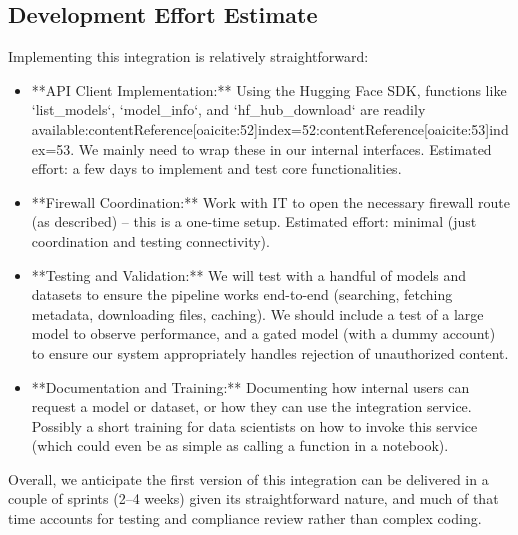 \documentclass{article}
\begin{document}
\subsection*{Development Effort Estimate}
Implementing this integration is relatively straightforward:
\begin{itemize}
    \item **API Client Implementation:** Using the Hugging Face SDK, functions like `list_models`, `model_info`, and `hf_hub_download` are readily available:contentReference[oaicite:52]{index=52}:contentReference[oaicite:53]{index=53}. We mainly need to wrap these in our internal interfaces. Estimated effort: a few days to implement and test core functionalities.
    \item **Firewall Coordination:** Work with IT to open the necessary firewall route (as described) – this is a one-time setup. Estimated effort: minimal (just coordination and testing connectivity).
    \item **Testing and Validation:** We will test with a handful of models and datasets to ensure the pipeline works end-to-end (searching, fetching metadata, downloading files, caching). We should include a test of a large model to observe performance, and a gated model (with a dummy account) to ensure our system appropriately handles rejection of unauthorized content.
    \item **Documentation and Training:** Documenting how internal users can request a model or dataset, or how they can use the integration service. Possibly a short training for data scientists on how to invoke this service (which could even be as simple as calling a function in a notebook).
\end{itemize}
Overall, we anticipate the first version of this integration can be delivered in a couple of sprints (2–4 weeks) given its straightforward nature, and much of that time accounts for testing and compliance review rather than complex coding.
\end{document}
